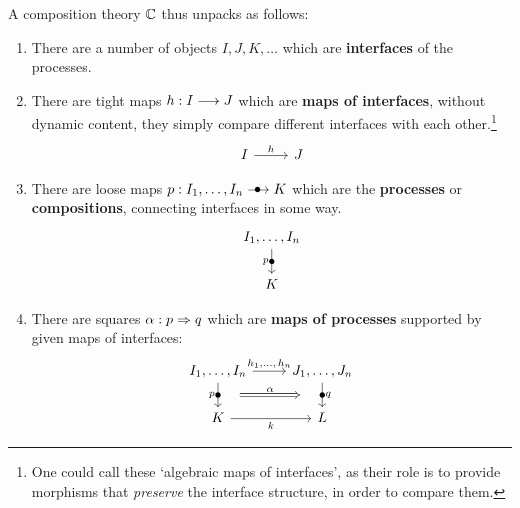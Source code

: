 A composition theory $\Comp$ thus unpacks as follows:
\begin{enumerate}
	\item There are a number of objects $I, J, K, \ldots$ which are \textbf{interfaces} of the processes.%
	\item There are tight maps $h: I \longrightarrow J$ which are \textbf{maps of interfaces}, without dynamic content, they simply compare different interfaces with each other.\footnote{One could call these `algebraic maps of interfaces', as their role is to provide morphisms that \emph{preserve} the interface structure, in order to compare them.}
	\begin{equation}
		\begin{tikzcd}[ampersand replacement=\&]
			I \& J
			\arrow["h", from=1-1, to=1-2]
		\end{tikzcd}
	\end{equation}
	\item There are loose maps $p : I_1, \ldots, I_n \verto K$  which are the \textbf{processes} or \textbf{compositions}, connecting interfaces in some way.
	\begin{equation}
		\begin{tikzcd}[ampersand replacement=\&]
			I_1, \ldots, I_n \\
			K
			\arrow["p"', "\bullet"{marking}, from=1-1, to=2-1]
		\end{tikzcd}
	\end{equation}
	\item There are squares $\alpha : p \Rightarrow q$ which are \textbf{maps of processes} supported by given maps of interfaces:
	\begin{equation}
		\begin{tikzcd}[ampersand replacement=\&]
			{I_1, \ldots, I_n} \& {J_1, \ldots, J_n} \\
			K \& L
			\arrow["{h_1, \ldots,\, h_n}", from=1-1, to=1-2]
			\arrow[""{name=0, anchor=center, inner sep=0}, "p"', "\bullet"{marking}, from=1-1, to=2-1]
			\arrow["k"', from=2-1, to=2-2]
			\arrow[""{name=1, anchor=center, inner sep=0}, "q", "\bullet"{marking}, from=1-2, to=2-2]
			\arrow["\alpha", shorten <=15pt, shorten >=15pt, Rightarrow, from=0, to=1]
		\end{tikzcd}
	\end{equation}
\end{enumerate}

